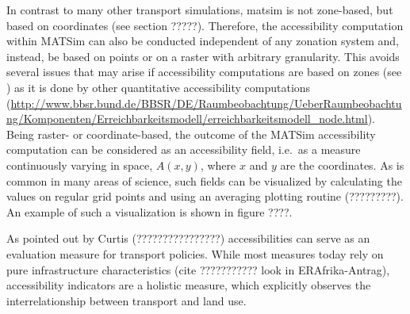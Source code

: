 In contrast to many other transport simulations, \gls{matsim} is not zone-based, but based on coordinates (see section ?????). Therefore, the accessibility computation within MATSim can also be conducted independent of any zonation system and, instead, be based on points or on a raster with arbitrary granularity. This avoids several issues that may arise if accessibility computations are based on zones (see \citep[e.g.,][]{NicolaiNagel2012HiResAccessibilityMethodInBook}) as it is done by other quantitative accessibility computations 
%
%
(\url{http://www.bbsr.bund.de/BBSR/DE/Raumbeobachtung/UeberRaumbeobachtung/Komponenten/Erreichbarkeitsmodell/erreichbarkeitsmodell_node.html}). Being raster- or coordinate-based, the outcome of the MATSim accessibility computation can be considered as an accessibility field,
i.e.\ as a measure continuously varying in space, $A(x,y)$, where $x$ and $y$
are the coordinates. As is common in many areas of science, such
fields can be visualized by calculating the values on regular grid
points and using an averaging plotting routine (?????????). An example of such a visualization is shown in figure ????.

As pointed out by Curtis (????????????????) accessibilities can serve as an evaluation measure for transport policies. While most measures today rely on pure infrastructure characteristics (cite ??????????? look in ERAfrika-Antrag), accessibility indicators are a holistic measure, which explicitly observes the interrelationship between transport and land use.

